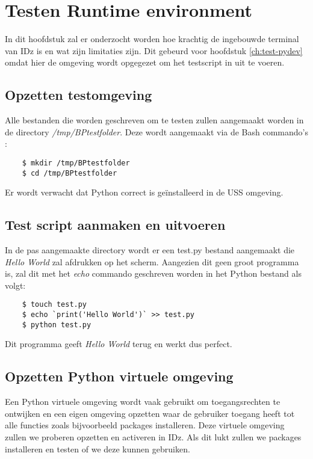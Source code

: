 \chapter{Testen Runtime environment}
\label{ch:test-runtime}
In dit hoofdstuk zal er onderzocht worden hoe krachtig de ingebouwde terminal van IDz is en wat zijn limitaties zijn. Dit gebeurd voor hoofdstuk \ref{ch:test-pydev} omdat hier de omgeving wordt opgegezet om het testscript in uit te voeren. \\


\section{Opzetten testomgeving}
Alle bestanden die worden geschreven om te testen zullen aangemaakt worden in de directory \textit{/tmp/BPtestfolder}. 
Deze wordt aangemaakt via de Bash commando's : 

\begin{lstlisting}
    $ mkdir /tmp/BPtestfolder
    $ cd /tmp/BPtestfolder
\end{lstlisting}

Er wordt verwacht dat Python correct is geïnstalleerd in de USS omgeving.

\section{Test script aanmaken en uitvoeren}
In de pas aangemaakte directory wordt er een test.py bestand aangemaakt die \textit{Hello World} zal afdrukken op het scherm. Aangezien dit geen groot programma is, zal dit met het \textit{echo} commando geschreven worden in het Python bestand als volgt:\

\begin{lstlisting}
    $ touch test.py
    $ echo `print('Hello World')` >> test.py
    $ python test.py
\end{lstlisting}

Dit programma geeft \textit{Hello World} terug en werkt dus perfect.

\section{Opzetten Python virtuele omgeving}
Een Python virtuele omgeving wordt vaak gebruikt om toegangsrechten te ontwijken en een eigen omgeving opzetten waar de gebruiker toegang heeft tot alle functies zoals bijvoorbeeld packages installeren. Deze virtuele omgeving zullen we proberen opzetten en activeren in IDz. Als dit lukt zullen we packages installeren en testen of we deze kunnen gebruiken.

